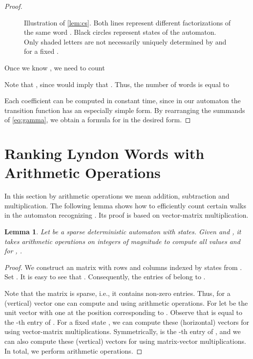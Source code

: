 \documentclass{article}
\newcommand{\mayqed}{}
\newtheorem{lemma}[theorem]{Lemma}
\theoremstyle{definition}
\theoremstyle{remark}
\begin{document}
\begin{proof}
\begin{figure}[htpb]
{
 }
\caption{\label{fig:proof}
  Illustration of \cref{lem:cs}.
  Both lines represent different factorizations of the same word .
  Black circles represent states of the automaton.
  Only shaded letters are not necessarily uniquely determined by  and  for a fixed .
}
\end{figure}
  
  Once we know , we need to count
  
  Note that , since  would
  imply that .
  Thus, the number of words  is equal to
  
  Each coefficient  can be computed in constant time, since in our automaton 
  the transition function  has an especially simple form.
  By rearranging the summands of \eqref{eq:gamma}, we obtain a formula for 
  in the desired form.
\mayqed\end{proof}







\section{Ranking Lyndon Words with  Arithmetic Operations}\label{sec:arith}
In this section by arithmetic operations we mean addition, subtraction and multiplication.
The following lemma shows how to efficiently count certain walks in the automaton  recognizing .
Its proof is based on vector-matrix multiplication.
\begin{lemma}\label{lem:mat}
  Let  be a sparse deterministic automaton with  states.
  Given  and  , it takes  arithmetic operations on integers of magnitude  to compute
  all values  and  for , .
\end{lemma}
\begin{proof}
  We construct an  matrix  with rows and columns indexed by states from .
  Set .
  It is easy to see that .
  Consequently, the entries of  belong to .
  
  Note that the matrix  is sparse, i.e., it contains  non-zero entries.
  Thus, for a (vertical) vector  one can compute  and  using  
  arithmetic operations.
  For  let  be the unit vector with one at the position corresponding to .
  Observe that  is equal to the -th entry of .
  For a fixed state , we can compute these (horizontal) vectors for  using
   vector-matrix multiplications.
  Symmetrically,  is the -th entry of ,
  and we can also compute these (vertical) vectors for  using
   matrix-vector multiplications.
  In total, we perform  arithmetic operations.
\mayqed\end{proof}
\end{document}
